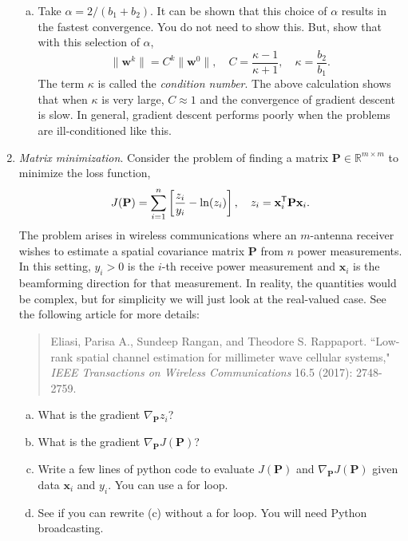 \documentclass[11pt]{article}
\def\R{{\mathbb{R}}}
\def\x{\times}
\newcommand{\wbf}{\mathbf{w}}
\newcommand{\xbf}{\mathbf{x}}
\newcommand{\Pbf}{\mathbf{P}}
\newcommand{\tran}{^{\text{\sf T}}}
\begin{document}
\begin{enumerate}
\begin{enumerate}[(a)]
\item Take $\alpha = 2/(b_1+b_2)$.  It can be shown that this choice of $\alpha$ results in the fastest convergence.  You do not need to show this.
But, show that with this selection of $\alpha$,
\[
    \|\wbf^k\| = C^k \|\wbf^0\|, \quad C = \frac{\kappa-1}{\kappa+1 }, \quad
    \kappa = \frac{b_2}{b_1}.
\]
The term $\kappa$ is called the \emph{condition number}.  The above calculation
shows that when $\kappa$ is very large, $C \approx 1$ and the convergence
of gradient descent is slow.  In general, gradient descent performs poorly
when the problems are ill-conditioned like this.
\end{enumerate}

\item \emph{Matrix minimization}.  Consider the problem of finding a matrix
$\Pbf \in \R^{m \x m}$ to minimize the loss function,
\[
    J(\Pbf) = \sum_{i=1}^n \left[ \frac{z_i}{y_i} - \ln(z_i) \right],
    \quad
    z_i = \xbf_i\tran \Pbf \xbf_i.
\]
The problem arises in wireless communications where an $m$-antenna receiver wishes
to estimate a spatial covariance matrix $\Pbf$ from $n$ power measurements.
In this setting, $y_i > 0$ is the $i$-th receive power measurement and $\xbf_i$
is the beamforming direction for that measurement.  In reality, the quantities
would be complex, but for simplicity we will just look at the real-valued case.
See the following article for more details:
\begin{quote}
  Eliasi, Parisa A., Sundeep Rangan, and Theodore S. Rappaport. ``Low-rank spatial channel estimation for millimeter wave cellular systems," \emph{IEEE Transactions on Wireless Communications} 16.5 (2017): 2748-2759.
\end{quote}
\begin{enumerate}[(a)]
\item What is the gradient $\nabla_{\Pbf} z_i$?

\item What is the gradient $\nabla_{\Pbf} J(\Pbf)$?

\item Write a few lines of python code to evaluate $J(\Pbf)$ and
$\nabla_{\Pbf} J(\Pbf)$ given data $\xbf_i$ and $y_i$.  You can use a for loop.

\item See if you can rewrite (c) without a for loop.  You will need Python broadcasting.
\end{enumerate}


\end{enumerate}
\end{document}
